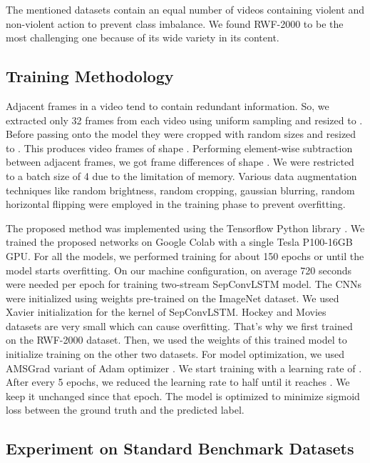 \documentclass[conference]{IEEEtran}
\begin{document}
The mentioned datasets contain an equal number of videos containing violent and non-violent action to prevent class imbalance. We found RWF-2000 to be the most challenging one because of its wide variety in its content.






\subsection{Training Methodology}
Adjacent frames in a video tend to contain redundant information. So, we extracted only 32 frames from each video using uniform sampling and resized to . Before passing onto the model they were cropped with random sizes and resized to . This produces video frames of shape . Performing element-wise subtraction between adjacent frames, we got frame differences of shape . We were restricted to a batch size of 4 due to the limitation of memory. Various data augmentation techniques like random brightness, random cropping, gaussian blurring, random horizontal flipping were employed in the training phase to prevent overfitting.

The proposed method was implemented using the Tensorflow Python library \cite{tensorflow2015-whitepaper}. We trained the proposed networks on Google Colab with a single Tesla P100-16GB GPU. For all the models, we performed training for about 150 epochs or until the model starts overfitting. On our machine configuration, on average 720 seconds were needed per epoch for training two-stream SepConvLSTM model. The CNNs were initialized using weights pre-trained on the ImageNet dataset. We used Xavier initialization \cite{glorot2010understanding} for the kernel of SepConvLSTM. Hockey and Movies datasets are very small which can cause overfitting. That's why we first trained on the RWF-2000 dataset. Then, we used the weights of this trained model to initialize training on the other two datasets. For model optimization, we used AMSGrad variant of Adam optimizer \cite{reddi2019convergence}. We start training with a learning rate of . After every 5 epochs, we reduced the learning rate to half until it reaches . We keep it unchanged since that epoch. The model is optimized to minimize sigmoid loss between the ground truth and the predicted label. 



\subsection{Experiment on Standard Benchmark Datasets}
\end{document}
